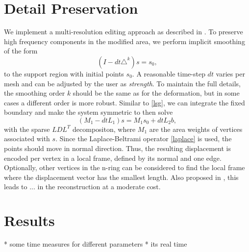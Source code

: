 \documentclass[twocolumn]{article}
\begin{document}
\section{Detail Preservation}
We implement a multi-resolution editing approach as described in \cite{bibid}.
To preserve high frequency components in the modified area, we perform implicit smoothing of the form
\begin{equation}
(I - dt \triangle^k) s = s_0,
\end{equation}
to the support region with initial points $s_0$. A reasonable time-step $dt$ varies per mesh and can be adjusted by the user as \textit{strength}.
To maintain the full details, the smoothing order $k$ should be the same as for the deformation, but in some cases a different order is more robust.
Similar to \eqref{lsg}, we can integrate the fixed boundary and make the system symmetric to then solve
\begin{equation}
(M_1 - dt L_1) s = M_1 s_0 + dt L_2 b,
\end{equation}
with the sparse $LDL^T$ decompositon, where $M_1$ are the area weights of vertices associated with $s$.
Since the Laplace-Beltrami operator \eqref{laplace} is used, the points should move in normal direction.
Thus, the resulting displacement is encoded per vertex in a local frame, defined by its normal and one edge. Optionally, other vertices in the n-ring can be considered to find the local frame where the displacement vector has the smallest length. Also proposed in \cite{}, this leads to ... in the reconstruction at a moderate cost.

\section{Results}
* some time measures for different parameters
* its real time



\end{document}
